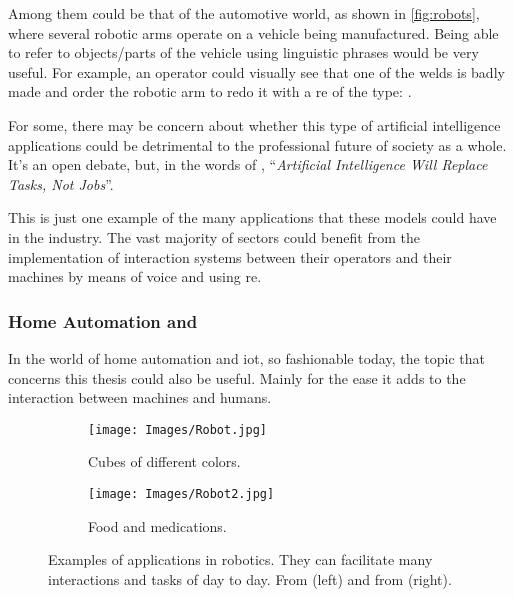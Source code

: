 Among them could be that of the automotive world, as shown in
\vref{fig:robots}, where several robotic arms operate on a vehicle being
manufactured. Being able to refer to objects/parts of the vehicle using
linguistic phrases would be very useful. For example, an operator could
visually see that one of the welds is badly made and order the robotic arm to
redo it with a \gls{re} of the type: .

\begin{remarkBox}
  For some, there may be concern about whether this type of artificial
  intelligence applications could be detrimental to the professional future of
  society as a whole. It's an open debate, but, in the words of
  \citeauthor*{contributor18:artif_intel_will_replac_tasks_not_jobs}
  \cite{contributor18:artif_intel_will_replac_tasks_not_jobs},
  ``\textit{Artificial Intelligence Will Replace Tasks, Not Jobs}''.
\end{remarkBox}

This is just one example of the many applications that these models could have
in the industry. The vast majority of sectors could benefit from the
implementation of interaction systems between their operators and their
machines by means of voice and using \gls{re}.

\subsubsection{Home Automation and }

In the world of home automation and \gls{iot}, so fashionable today, the topic
that concerns this thesis could also be useful. Mainly for the ease it adds to
the interaction between machines and humans.

\begin{figure}[ht]
  \centering
  \begin{subfigure}[t]{.55\textwidth}
    \centering
    \caption{Cubes of different colors.}
    \texttt{[image: Images/Robot.jpg]}
  \end{subfigure}\hfill
  \begin{subfigure}[t]{.4\textwidth}
    \centering
    \caption{Food and medications.}
    \texttt{[image: Images/Robot2.jpg]}
  \end{subfigure}
  \caption[Examples of applications in robotics]{Examples of applications in
    robotics. They can facilitate many interactions and tasks of day to
    day. From  (left) and from
     (right).}\label{fig:robot}
\end{figure}

